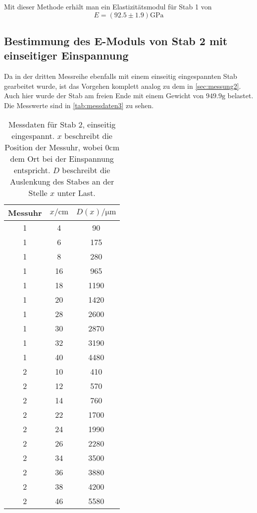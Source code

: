 Mit dieser Methode erhält man ein Elastizitätsmodul für Stab 1 von
\begin{equation}
	E = (92.5 \pm 1.9) \si{\giga\pascal}
	\label{eqn:E-messung2}
\end{equation}

\subsection{Bestimmung des E-Moduls von Stab 2 mit einseitiger Einspannung}
\label{sec:messung3}

Da in der dritten Messreihe ebenfalls mit einem einseitig eingespannten Stab gearbeitet
wurde, ist das Vorgehen komplett analog zu dem in \autoref{sec:messung2}.
Auch hier wurde
der Stab am freien Ende mit einem Gewicht von $949.9\si{\gram}$ belastet.
\\
Die Messwerte sind in \autoref{tab:messdaten3} zu sehen.

\begin{table}
	\centering
	\caption{Messdaten für Stab 2, einseitig eingespannt. $x$ beschreibt
	die Position der Messuhr, wobei $0\si{\centi\meter}$
	dem Ort bei der Einspannung entspricht.
	$D$ beschreibt die Auslenkung des Stabes an der Stelle $x$ unter Last.}
	\label{tab:messdaten3}
	\begin{tabular}{c c c}
	\toprule
	Messuhr &
	$x / \si{\centi\meter}$ &
	$D(x) / \si{\micro\meter}$
	\\
	\midrule
	1 & 4 & 90 \\
	1 & 6 & 175 \\
	1 & 8 & 280 \\
	1 & 16 & 965 \\
	1 & 18 & 1190 \\
	1 & 20 & 1420 \\
	1 & 28 & 2600 \\
	1 & 30 & 2870 \\
	1 & 32 & 3190 \\
	1 & 40 & 4480 \\
	2 & 10 & 410 \\
	2 & 12 & 570 \\
	2 & 14 & 760 \\
	2 & 22 & 1700 \\
	2 & 24 & 1990 \\
	2 & 26 & 2280 \\
	2 & 34 & 3500 \\
	2 & 36 & 3880 \\
	2 & 38 & 4200 \\
	2 & 46 & 5580 \\
	\bottomrule
\end{tabular}
\end{table}

